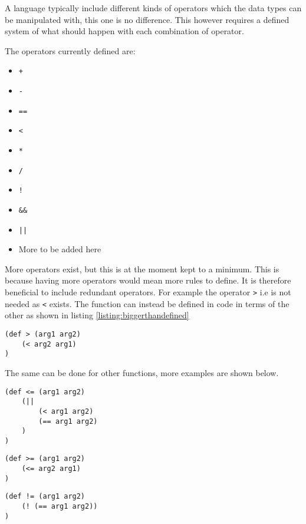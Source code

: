 A language typically include different kinds of operators which the data types can be manipulated with, this one is no difference.
This however requires a defined system of what should happen with each combination of operator. 

The operators currently defined are:
\begin{itemize}
	\item \texttt{+}
	\item \texttt{-}
	\item \texttt{==}
	\item \texttt{<}
	\item \texttt{*}
	\item \texttt{/}
	\item \texttt{!}
	\item \texttt{\&\&}
	\item \texttt{||}
	\item More to be added here
\end{itemize}

More operators exist, but this is at the moment kept to a minimum. 
This is because having more operators would mean more rules to define. 
It is therefore beneficial to include redundant operators. 
For example the operator \texttt{>} i.e is not needed as \texttt{<} exists.
The function can instead be defined in code in terms of the other as shown in listing \ref{listing:biggerthandefined}

\begin{lstlisting}[caption=Bigger than function defined in terms of less than,
label=listing:biggerthandefined]
(def > (arg1 arg2)
	(< arg2 arg1)
)
\end{lstlisting}

The same can be done for other functions, more examples are shown below.

\begin{lstlisting}[caption=Less than or equal to defined with the OR operator]
(def <= (arg1 arg2)
	(|| 
		(< arg1 arg2)
		(== arg1 arg2)
	)
)
\end{lstlisting}

\begin{lstlisting}[caption=More than or equal to defined with less than or equal to]
(def >= (arg1 arg2)
	(<= arg2 arg1) 
)
\end{lstlisting}

\begin{lstlisting}[caption=Definition for is not equal with the invert operator]
(def != (arg1 arg2)
	(! (== arg1 arg2))
)
\end{lstlisting}


